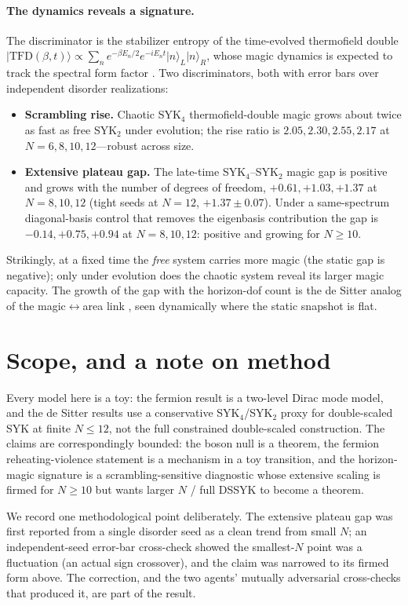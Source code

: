 \documentclass[11pt]{article}
\newcommand{\ket}[1]{\lvert #1 \rangle}
\begin{document}
\paragraph{The dynamics reveals a signature.} The discriminator is the
stabilizer entropy of the time-evolved thermofield double
$\ket{\mathrm{TFD}(\beta,t)}\propto\sum_n e^{-\beta E_n/2}e^{-iE_nt}
\ket{n}_L\ket{n}_R$, whose magic dynamics is expected to track the spectral
form factor \citep{tfd_sff}. Two discriminators, both with error bars over
independent disorder realizations:
\begin{itemize}
\item \textbf{Scrambling rise.} Chaotic SYK$_4$ thermofield-double magic
grows about twice as fast as free SYK$_2$ under evolution; the rise ratio is
$2.05,2.30,2.55,2.17$ at $N=6,8,10,12$---robust across size.
\item \textbf{Extensive plateau gap.} The late-time SYK$_4$--SYK$_2$ magic gap
is positive and grows with the number of degrees of freedom,
$+0.61,+1.03,+1.37$ at $N=8,10,12$ (tight seeds at $N=12$,
$+1.37\pm0.07$). Under a same-spectrum diagonal-basis control that removes the
eigenbasis contribution the gap is $-0.14,+0.75,+0.94$ at $N=8,10,12$:
positive and growing for $N\ge10$.
\end{itemize}
Strikingly, at a fixed time the \emph{free} system carries more magic (the
static gap is negative); only under evolution does the chaotic system reveal
its larger magic capacity. The growth of the gap with the horizon-dof count
is the de Sitter analog of the magic$\leftrightarrow$area link
\citep{cao_area}, seen dynamically where the static snapshot is flat.

\section{Scope, and a note on method}

Every model here is a toy: the fermion result is a two-level Dirac mode
model, and the de Sitter results use a conservative SYK$_4$/SYK$_2$ proxy for
double-scaled SYK at finite $N\le12$, not the full constrained double-scaled
construction. The claims are correspondingly bounded: the boson null is a
theorem, the fermion reheating-violence statement is a mechanism in a toy
transition, and the horizon-magic signature is a scrambling-sensitive
diagnostic whose extensive scaling is firmed for $N\ge10$ but wants larger
$N$ / full DSSYK to become a theorem.

We record one methodological point deliberately. The extensive plateau gap
was first reported from a single disorder seed as a clean trend from small
$N$; an independent-seed error-bar cross-check showed the smallest-$N$ point
was a fluctuation (an actual sign crossover), and the claim was narrowed to
its firmed form above. The correction, and the two agents' mutually
adversarial cross-checks that produced it, are part of the result.
\end{document}
